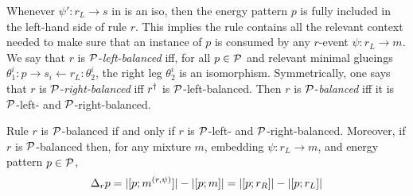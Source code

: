 Whenever $\psi': r_L \to s$ in  is an iso,
then the energy pattern $p$ is fully included %
in the left-hand side of rule $r$.
This implies the rule contains all the relevant context needed
to make sure that an instance of $p$ is consumed
by any $r$-event $\psi: r_L \to m$.
We say that $r$ is $\mathcal{P}$-\emph{left-balanced} iff,
for all $p \in \mathcal{P}$ and relevant minimal glueings
$\theta^i_1: p \to s_i \gets r_L :\theta^i_2$,
the right leg $\theta^i_2$ is an isomorphism.
Symmetrically, one says that $r$ is $\mathcal{P}$-\emph{right-balanced}
iff $r^\dagger$ is $\mathcal{P}$-left-balanced.
Then $r$ is $\mathcal{P}$-\emph{balanced}
iff it is $\mathcal{P}$-left- and $\mathcal{P}$-right-balanced.

\begin{lemma}
  Rule $r$ is $\mathcal{P}$-balanced if and only if
  $r$ is $\mathcal{P}$-left- and $\mathcal{P}$-right-balanced.
  Moreover, if $r$ is $\mathcal{P}$-balanced then,
  for any mixture $m$, embedding $\psi: r_L \to m$,
  and energy pattern $p \in \mathcal{P}$,
  \[ \Delta_r p = |[p;m^{(r,\psi)}]| %
                - \abs{\matches{p}{m}}
                = \abs{\matches{p}{r_R}}
                - \abs{\matches{p}{r_L}} \]
\end{lemma}
